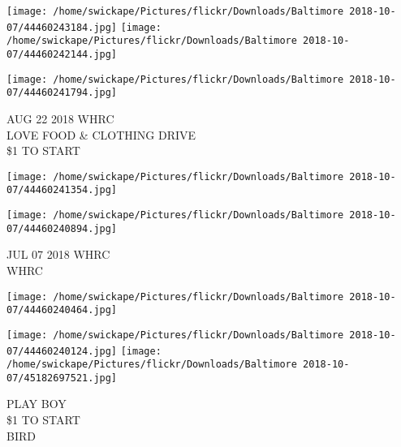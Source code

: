\documentclass[10pt,letterpaper]{article}
\begin{document}
\texttt{[image: /home/swickape/Pictures/flickr/Downloads/Baltimore 2018-10-07/44460243184.jpg]}
\texttt{[image: /home/swickape/Pictures/flickr/Downloads/Baltimore 2018-10-07/44460242144.jpg]}

\texttt{[image: /home/swickape/Pictures/flickr/Downloads/Baltimore 2018-10-07/44460241794.jpg]}

AUG 22 2018 WHRC\\
LOVE FOOD \& CLOTHING DRIVE\\
\$1 TO START\\
\pagebreak

\texttt{[image: /home/swickape/Pictures/flickr/Downloads/Baltimore 2018-10-07/44460241354.jpg]}

\vspace{0.25in}
\texttt{[image: /home/swickape/Pictures/flickr/Downloads/Baltimore 2018-10-07/44460240894.jpg]}

JUL 07 2018 WHRC\\
WHRC\\
\pagebreak

\texttt{[image: /home/swickape/Pictures/flickr/Downloads/Baltimore 2018-10-07/44460240464.jpg]}

\vspace{0.25in}
\texttt{[image: /home/swickape/Pictures/flickr/Downloads/Baltimore 2018-10-07/44460240124.jpg]}
\texttt{[image: /home/swickape/Pictures/flickr/Downloads/Baltimore 2018-10-07/45182697521.jpg]}

PLAY BOY\\
\$1 TO START\\
BIRD\\
\pagebreak
\end{document}
